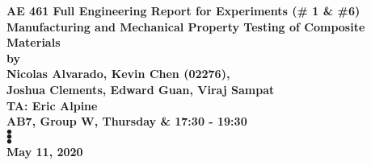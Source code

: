 \begin{titlepage}
    \begin{center}
        \vspace*{1cm}
        \large
        \textbf{AE 461 Full Engineering Report for Experiments (\# 1 \& \#6)} \\
        \vspace{0.5cm}
        \textbf{Manufacturing and Mechanical Property Testing of Composite Materials} \\
        \vspace{0.5cm}
        \normalsize
        \textbf{by} \\
        \vspace{0.5cm}
        \textbf{Nicolas Alvarado, Kevin Chen (02276),\\Joshua Clements, Edward Guan, Viraj Sampat} \\
        \vspace{0.5cm}
        \textbf{TA: Eric Alpine} \\
        \vspace{0.5cm}
        \textbf{AB7, Group W, Thursday \& 17:30 - 19:30} \\

        $\bullet$\\
        \vspace{2.5cm}
        $\bullet$\\
        \vspace{2.5cm}
        $\bullet$\\
        \vspace{1.75cm}
        \textbf{May 11, 2020}
    \end{center}
\end{titlepage}